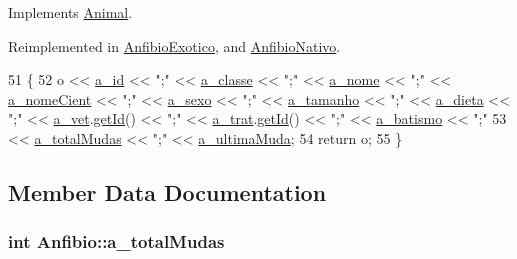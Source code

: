 Implements \hyperlink{classAnimal_afb840c2d5209cba2e9d33d34bf9f5e3e}{Animal}.



Reimplemented in \hyperlink{classAnfibioExotico_ac5d435b804cb80f3a6c3a476ed9c6990}{Anfibio\+Exotico}, and \hyperlink{classAnfibioNativo_a2db2ade56011851b6dab72d8598f52c9}{Anfibio\+Nativo}.


\begin{DoxyCode}
51 \{
52     o << \hyperlink{classAnimal_a1eab12d1133a739dc0fea720cf6cc927}{a\_id} << \textcolor{stringliteral}{";"} << \hyperlink{classAnimal_a1f32b4455559489b5f5dce71913a6f8f}{a\_classe} << \textcolor{stringliteral}{";"} << \hyperlink{classAnimal_ad815bbe345d7c5274858ac8ccb24bc52}{a\_nome} << \textcolor{stringliteral}{";"} << 
      \hyperlink{classAnimal_af2ae0fc23b0eaf3edaee4579f6199dfc}{a\_nomeCient} << \textcolor{stringliteral}{";"} << \hyperlink{classAnimal_af2b1c520d145f82af7a5a88bb4271a0d}{a\_sexo} << \textcolor{stringliteral}{";"} << \hyperlink{classAnimal_a72366b060dfdbc0dd074fbe41decfcc2}{a\_tamanho} << \textcolor{stringliteral}{";"} << 
      \hyperlink{classAnimal_a32088524517a531af269e3ec04275135}{a\_dieta} << \textcolor{stringliteral}{";"} << \hyperlink{classAnimal_a12ce5681957e27dae674cbbde7fb1e4f}{a\_vet}.\hyperlink{classFuncionario_a0288286a907e587b7ab75d6c23354a06}{getId}() << \textcolor{stringliteral}{";"} << \hyperlink{classAnimal_a19fbf607b29b06a86f598dd1ffb8c712}{a\_trat}.\hyperlink{classFuncionario_a0288286a907e587b7ab75d6c23354a06}{getId}() << \textcolor{stringliteral}{";"} << 
      \hyperlink{classAnimal_a4e308163c5b3d82e546fb39b399bcb71}{a\_batismo} << \textcolor{stringliteral}{";"}
53     << \hyperlink{classAnfibio_a322af56e1ff61753e6abfe2693d29504}{a\_totalMudas} << \textcolor{stringliteral}{";"} << \hyperlink{classAnfibio_a674f19d430b4781216fac1fee2567771}{a\_ultimaMuda};
54     \textcolor{keywordflow}{return} o;
55 \}\end{DoxyCode}


\subsection{Member Data Documentation}
\subsubsection[{\texorpdfstring{a\+\_\+total\+Mudas}{a_totalMudas}}]{\setlength{\rightskip}{0pt plus 5cm}int Anfibio\+::a\+\_\+total\+Mudas\hspace{0.3cm}{\ttfamily [protected]}}\hypertarget{classAnfibio_a322af56e1ff61753e6abfe2693d29504}{}\label{classAnfibio_a322af56e1ff61753e6abfe2693d29504}


